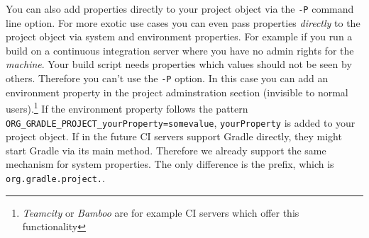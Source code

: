 You can also add properties directly to your project object via the \texttt{-P} command line option. For more exotic use cases you can even pass properties \emph{directly} to the project object via system and environment properties. For example if you run a build on a continuous integration server where you have no admin rights for the \emph{machine}. Your build script needs properties which values should not be seen by others. Therefore you can't use the \texttt{-P} option. In this case you can add an environment property in the project adminstration section (invisible to normal users).\footnote{\emph{Teamcity} or \emph{Bamboo} are for example CI servers which offer this functionality} If the environment property follows the pattern \texttt{ORG\_GRADLE\_PROJECT\_yourProperty=somevalue}, \texttt{yourProperty} is added to your project object. If in the future CI servers support Gradle directly, they might start Gradle via its main method. Therefore we already support the same mechanism for system properties. The only difference is the prefix, which is \texttt{org.gradle.project.}.
